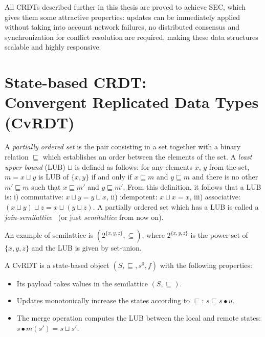 All CRDTs described further in this thesis are proved to achieve SEC, which
gives them some attractive properties: updates can be immediately applied
without taking into account network failures, no distributed consensus and
synchronization for conflict resolution are required, making these data
structures scalable and highly responsive.

\section[State-based CRDT: Convergent Replicated Data Types (CvRDT)]{State-based
CRDT:\\Convergent Replicated Data Types (CvRDT)}
\label{sec:convergent_replicated_data_types}

A \textit{partially ordered set} is the pair consisting in a set together with a
binary relation $\sqsubseteq$ which establishes an order between the elements of
the set. A \textit{least upper bound} (LUB) $\sqcup$ is defined as follows: for
any elements $x$, $y$ from the set, $m = x \sqcup y$ is LUB of $\{x, y\}$ if and
only if $x \sqsubseteq m$ and $y \sqsubseteq m$ and there is no other $m'
\sqsubseteq m$ such that $x \sqsubseteq m'$ and $y \sqsubseteq m'$. From this
definition, it follows that a LUB is: i) commutative: $x \sqcup y = y \sqcup x$,
ii) idempotent: $x \sqcup x = x$, iii) associative: $(x \sqcup y) \sqcup z = x
\sqcup (y \sqcup z)$. A partially ordered set which has a LUB is called a
\textit{join-semilattice}~\cite{semilattice} (or just \textit{semilattice} from
now on). 

An example of semilattice is $(2^{\{x, y, z\}}, \subseteq)$, where $2^{\{x, y,
z\}}$ is the power set of $\{x, y, z\}$ and the LUB is given by set-union.

\begin{definition}
\begin{itshape}
A CvRDT is a state-based object $(S,\sqsubseteq,s^{0},f)$ with the following
properties:
\begin{itemize}
  \item Its payload takes values in the semilattice $(S,\sqsubseteq)$.
  \item Updates monotonically increase the states according to $\sqsubseteq$:
  $s \sqsubseteq s \bullet u$.
  \item The merge operation computes the LUB between the local and remote
  states: $s \bullet m(s') = s \sqcup s'$.
\end{itemize} 
\end{itshape}
\end{definition}

